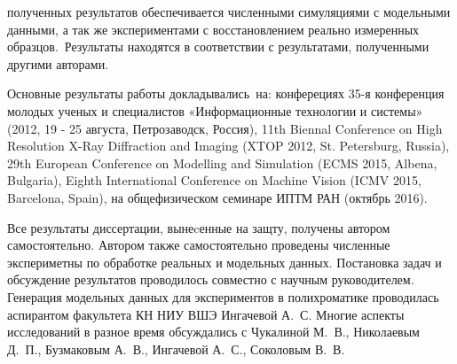 {\reliability} полученных результатов обеспечивается численными симуляциями с модельными данными, а так же экспериментами с восстановлением реально измеренных образцов.\ Результаты находятся в соответствии с результатами, полученными другими авторами.


{\probation}
Основные результаты работы докладывались~на: конферециях 
35-я конференция молодых ученых и специалистов «Информационные технологии и системы» (2012, 19 - 25 августа, Петрозаводск, Россия),
11th Biennal Conference on High Resolution X-Ray Diffraction and Imaging (XTOP 2012, St. Petersburg, Russia), 
29th European Conference on Modelling and Simulation (ECMS 2015, Albena, Bulgaria),
Eighth International Conference on Machine Vision (ICMV 2015, Barcelona, Spain),
на общефизическом семинаре ИПТМ РАН (октябрь 2016).

{\contribution} Все результаты диссертации, вынеcенные на защту, получены автором самостоятельно. Автором также самостоятельно проведены численные экспериметны по обработке реальных и модельных данных. Постановка задач и обсуждение результатов проводилось совместно с научным руководителем. Генерация модельных данных для экспериментов в полихроматике проводилась аспирантом факультета КН НИУ ВШЭ Ингачевой А.~С. Многие аспекты исследований в разное время обсуждались с Чукалиной М.~В., Николаевым Д.~П., Бузмаковым А.~В., Ингачевой А.~С., Соколовым В.~В.

